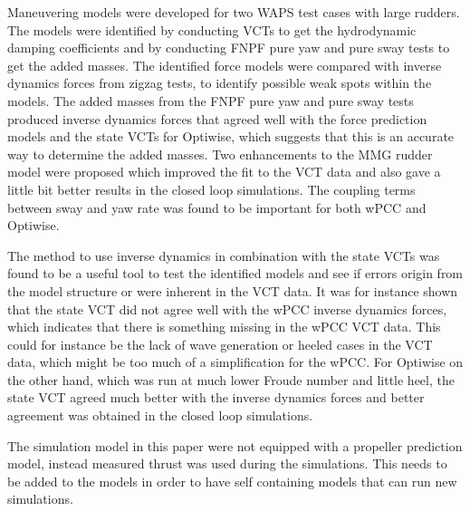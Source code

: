 %
\noindent Maneuvering models were developed for two WAPS test cases with large rudders. The models were identified by conducting VCTs to get the hydrodynamic damping coefficients and by conducting FNPF pure yaw and pure sway tests to get the added masses. The identified force models were compared with inverse dynamics forces from zigzag tests, to identify possible weak spots within the models.  
The added masses from the FNPF pure yaw and pure sway tests produced inverse dynamics forces that agreed well with the force prediction models and the state VCTs for Optiwise, which suggests that this is an accurate way to determine the added masses.
Two enhancements to the MMG rudder model were proposed which improved the fit to the VCT data and also gave a little bit better results in the closed loop simulations.
The coupling terms between sway and yaw rate was found to be important for both wPCC and Optiwise.

The method to use inverse dynamics in combination with the state VCTs was found to be a useful tool to test the identified models and see if errors origin from the model structure or were inherent in the VCT data.
It was for instance shown that the state VCT did not agree well with the wPCC inverse dynamics forces, which indicates that there is something missing in the wPCC VCT data. This could for instance be the lack of wave generation or heeled cases in the VCT data, which might be too much of a simplification for the wPCC.
For Optiwise on the other hand, which was run at much lower Froude number and little heel, the state VCT agreed much better with the inverse dynamics forces and better agreement was obtained in the closed loop simulations.

The simulation model in this paper were not equipped with a propeller prediction model, instead measured thrust was used during the simulations. This needs to be added to the models in order to have self containing models that can run new simulations. 
